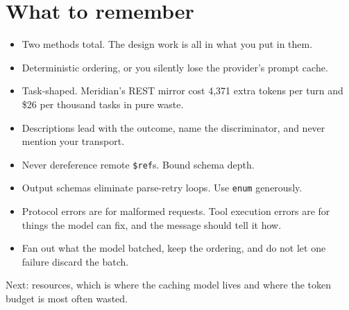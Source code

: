 \section{What to remember}

\begin{itemize}[leftmargin=1.6em, itemsep=3pt]
\item Two methods total. The design work is all in what you put in them.
\item Deterministic ordering, or you silently lose the provider's prompt cache.
\item Task-shaped. Meridian's REST mirror cost 4,371 extra tokens per turn and \$26 per thousand tasks in pure waste.
\item Descriptions lead with the outcome, name the discriminator, and never
mention your transport.
\item Never dereference remote \texttt{\$ref}s. Bound schema depth.
\item Output schemas eliminate parse-retry loops. Use \texttt{enum} generously.
\item Protocol errors are for malformed requests. Tool execution errors are for
things the model can fix, and the message should tell it how.
\item Fan out what the model batched, keep the ordering, and do not let one
failure discard the batch.
\end{itemize}

Next: resources, which is where the caching model lives and where the token
budget is most often wasted.

